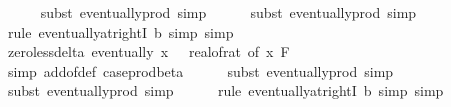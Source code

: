 \begin{isabellebody}
\ \ \ \ \isamarkupfalse%
\ {\isacharparenleft}{\kern0pt}subst\ eventually{\isacharunderscore}{\kern0pt}prod{}{\isacharprime}{\kern0pt}{\isacharcomma}{\kern0pt}\ simp{\isacharparenright}{\kern0pt}\isanewline
\ \ \ \ \isamarkupfalse%
\ {\isacharparenleft}{\kern0pt}subst\ eventually{\isacharunderscore}{\kern0pt}prod{}{\isacharprime}{\kern0pt}{\isacharcomma}{\kern0pt}\ simp{\isacharparenright}{\kern0pt}\isanewline
\ \ \ \ \isamarkupfalse%
\ {\isacharparenleft}{\kern0pt}rule\ eventually{\isacharunderscore}{\kern0pt}at{\isacharunderscore}{\kern0pt}rightI{\isacharbrackleft}{\kern0pt}\ b{\isacharequal}{\kern0pt}{\isachardoublequoteopen}{}{\isachardoublequoteclose}{\isacharbrackright}{\kern0pt}{\isacharcomma}{\kern0pt}\ simp{\isacharcomma}{\kern0pt}\ simp{\isacharparenright}{\kern0pt}\isanewline
\isanewline
\ \ \isamarkupfalse%
\ zero{\isacharunderscore}{\kern0pt}less{\isacharunderscore}{\kern0pt}delta{\isacharcolon}{\kern0pt}\ {\isachardoublequoteopen}eventually\ {\isacharparenleft}{\kern0pt}{\isasymlambda}x{\isachardot}{\kern0pt}\ {}\ {\isacharless}{\kern0pt}\ {\isacharparenleft}{\kern0pt}real{\isacharunderscore}{\kern0pt}of{\isacharunderscore}{\kern0pt}rat\ {\isacharparenleft}{\kern0pt}{\isasymdelta}{\isacharunderscore}{\kern0pt}of\ x{\isacharparenright}{\kern0pt}{\isacharparenright}{\kern0pt}{\isacharparenright}{\kern0pt}\ {\isacharquery}{\kern0pt}F{\isachardoublequoteclose}\isanewline
\ \ \ \ \isamarkupfalse%
\ {\isacharparenleft}{\kern0pt}simp\ add{\isacharcolon}{\kern0pt}{\isasymdelta}{\isacharunderscore}{\kern0pt}of{\isacharunderscore}{\kern0pt}def\ case{\isacharunderscore}{\kern0pt}prod{\isacharunderscore}{\kern0pt}beta{\isacharprime}{\kern0pt}{\isacharparenright}{\kern0pt}\isanewline
\ \ \ \ \isamarkupfalse%
\ {\isacharparenleft}{\kern0pt}subst\ eventually{\isacharunderscore}{\kern0pt}prod{}{\isacharprime}{\kern0pt}{\isacharcomma}{\kern0pt}\ simp{\isacharparenright}{\kern0pt}\isanewline
\ \ \ \ \isamarkupfalse%
\ {\isacharparenleft}{\kern0pt}subst\ eventually{\isacharunderscore}{\kern0pt}prod{}{\isacharprime}{\kern0pt}{\isacharcomma}{\kern0pt}\ simp{\isacharparenright}{\kern0pt}\isanewline
\ \ \ \ \isamarkupfalse%
\ {\isacharparenleft}{\kern0pt}rule\ eventually{\isacharunderscore}{\kern0pt}at{\isacharunderscore}{\kern0pt}rightI{\isacharbrackleft}{\kern0pt}\ b{\isacharequal}{\kern0pt}{\isachardoublequoteopen}{}{\isachardoublequoteclose}{\isacharbrackright}{\kern0pt}{\isacharcomma}{\kern0pt}\ simp{\isacharcomma}{\kern0pt}\ simp{\isacharparenright}{\kern0pt}\isanewline

\end{isabellebody}
